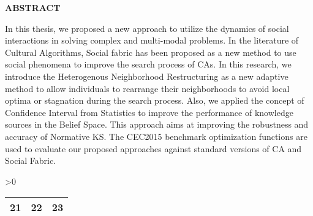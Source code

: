 \documentclass[12pt]{article}
\begin{document}
\begin{center}
	\textbf{ABSTRACT}
\end{center}
In this thesis, we proposed a new approach to utilize the dynamics of social interactions in solving complex and multi-modal problems.  In the literature of Cultural Algorithms, Social fabric has been proposed as a new method to use social phenomena to improve the search process of CAs. In this research, we introduce the Heterogenous Neighborhood Restructuring as a new adaptive method to allow individuals to rearrange their neighborhoods to avoid local optima or stagnation during the search process. 
Also, we applied the concept of Confidence Interval from Statistics to improve the performance of knowledge sources in the Belief Space. This approach aims at improving the robustness and accuracy of Normative KS. The CEC2015 benchmark optimization functions are used to evaluate our proposed approaches against standard versions of CA and Social Fabric.


\def\tabledata{} 
\loop
   \addto\tabledata{11 & 12 & 13\\
                    \hline}
   \advance {}
   \ifnum \fooo>0
\repeat 

\begin{tabular}{|c|c|c|}
   \hline
   \tabledata
   21 & 22 & 23\\ \hline
   \tabledata
\end{tabular}
\end{document}
